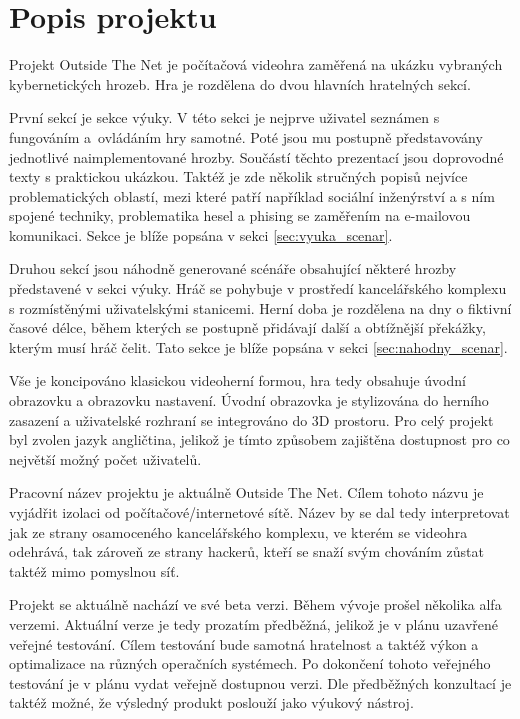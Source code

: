 \chapter{Popis projektu}

Projekt Outside The Net je počítačová videohra zaměřená na ukázku vybraných kybernetických hrozeb. Hra je rozdělena do dvou hlavních hratelných sekcí.

První sekcí je sekce výuky. V této sekci je nejprve uživatel seznámen s fungováním a~ovládáním hry samotné. Poté jsou mu postupně představovány jednotlivé naimplementované hrozby. Součástí těchto prezentací jsou doprovodné texty s praktickou ukázkou. Taktéž je zde několik stručných popisů nejvíce problematických oblastí, mezi které patří například sociální inženýrství a s ním spojené techniky, problematika hesel a phising se zaměřením na e-mailovou komunikaci. Sekce je blíže popsána v sekci \ref{sec:vyuka_scenar}.

Druhou sekcí jsou náhodně generované scénáře obsahující některé hrozby představené v sekci výuky. Hráč se pohybuje v prostředí kancelářského komplexu s rozmístěnými uživatelskými stanicemi. Herní doba je rozdělena na dny o fiktivní časové délce, během kterých se postupně přidávají další a obtížnější překážky, kterým musí hráč čelit. Tato sekce je blíže popsána v sekci \ref{sec:nahodny_scenar}.

Vše je koncipováno klasickou videoherní formou, hra tedy obsahuje úvodní obrazovku a obrazovku nastavení. Úvodní obrazovka je stylizována do herního zasazení a uživatelské rozhraní se integrováno do 3D prostoru. Pro celý projekt byl zvolen jazyk angličtina, jelikož je tímto způsobem zajištěna dostupnost pro co největší možný počet uživatelů.

Pracovní název projektu je aktuálně Outside The Net. Cílem tohoto názvu je vyjádřit izolaci od počítačové/internetové sítě. Název by se dal tedy interpretovat jak ze strany osamoceného kancelářského komplexu, ve kterém se videohra odehrává, tak zároveň ze strany hackerů, kteří se snaží svým chováním zůstat taktéž mimo pomyslnou síť.

Projekt se aktuálně nachází ve své beta verzi. Během vývoje prošel několika alfa verzemi. Aktuální verze je tedy prozatím předběžná, jelikož je v plánu uzavřené veřejné testování. Cílem testování bude samotná hratelnost a taktéž výkon a optimalizace na různých operačních systémech. Po dokončení tohoto veřejného testování je v plánu vydat veřejně dostupnou verzi. Dle předběžných konzultací je taktéž možné, že výsledný produkt poslouží jako výukový nástroj.
